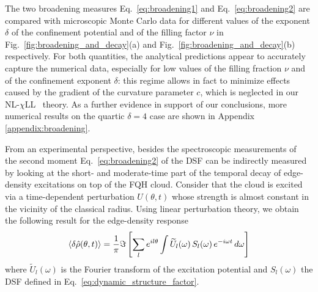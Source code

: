 \documentclass[twocolumn,pra,superscriptaddress,noshowpacs]{revtex4}
\newcommand{\nlchill}{NL-$\chi$LL }
\begin{document}
The two broadening measures Eq.~\eqref{eq:broadening1} and Eq.~\eqref{eq:broadening2} are compared with microscopic Monte Carlo data for different values of the exponent $\delta$ of the confinement potential and of the filling factor $\nu$
in Fig.~\ref{fig:broadening_and_decay}(a) and  Fig.~\ref{fig:broadening_and_decay}(b) respectively. 
For both quantities, the analytical predictions appear to accurately capture the numerical data, especially for low values of the filling fraction $\nu$ and of the confinement exponent $\delta$: this regime allows in fact to minimize effects caused by the gradient of the curvature parameter $c$, which is neglected in our \nlchill~theory. As a further evidence in support of our conclusions, more numerical results on the quartic $\delta=4$ case are shown in Appendix \ref{appendix:broadening}.

From an experimental perspective, besides the spectroscopic measurements of~\cite{Fabbri_PRA_2015} the second moment Eq.~\eqref{eq:broadening2} of the DSF can be indirectly measured by looking at the short- and moderate-time part of the temporal decay of edge-density excitations on top of the FQH cloud.
Consider that the cloud is excited via a time-dependent perturbation $U(\theta,t)$ whose strength is almost constant in the vicinity of the classical radius. 
Using linear perturbation theory, %
we obtain the following result for the edge-density response 
\begin{equation}
    \label{eq:perturbative_edge_response}
\braket{\delta\hat{\rho}(\theta,t)}=\frac{1}{\pi}\Im\left[
    \sum_l e^{i l \theta}
    \int \widetilde{U}_{l}(\omega) \,S_l(\omega) \,e^{-i\omega t}\,d\omega \right]
\end{equation}
where $\widetilde{U}_{l}(\omega)$ is the Fourier transform of the excitation potential and $S_l(\omega)$ the DSF defined in Eq.~\eqref{eq:dynamic_structure_factor}.
\end{document}
